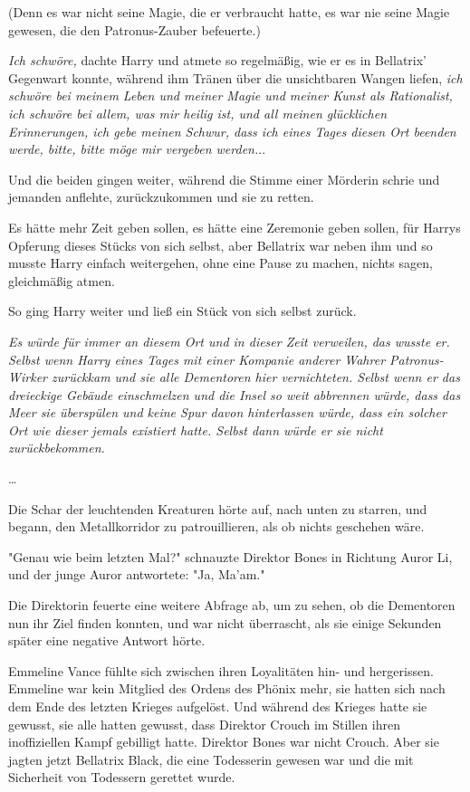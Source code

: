 {(Denn es war nicht seine Magie, die er verbraucht hatte, es war nie seine Magie gewesen, die den Patronus-Zauber befeuerte.)

\emph{Ich schwöre,} dachte Harry und atmete so regelmäßig, wie er es in Bellatrix' Gegenwart konnte, während ihm Tränen über die unsichtbaren Wangen liefen, \emph{ich schwöre bei meinem Leben und meiner Magie und meiner Kunst als Rationalist, ich schwöre bei allem, was mir heilig ist, und all meinen glücklichen Erinnerungen, ich gebe meinen Schwur, dass ich eines Tages diesen Ort beenden werde, bitte, bitte möge mir vergeben werden.}..

Und die beiden gingen weiter, während die Stimme einer Mörderin schrie und jemanden anflehte, zurückzukommen und sie zu retten.

Es hätte mehr Zeit geben sollen, es hätte eine Zeremonie geben sollen, für Harrys Opferung dieses Stücks von sich selbst, aber Bellatrix war neben ihm und so musste Harry einfach weitergehen, ohne eine Pause zu machen, nichts sagen, gleichmäßig atmen.

So ging Harry weiter und ließ ein Stück von sich selbst zurück.

\emph{Es würde für immer an diesem Ort und in dieser Zeit verweilen, das wusste er. Selbst wenn Harry eines Tages mit einer Kompanie anderer Wahrer Patronus-Wirker zurückkam und sie alle Dementoren hier vernichteten. Selbst wenn er das dreieckige Gebäude einschmelzen und die Insel so weit abbrennen würde, dass das Meer sie überspülen und keine Spur davon hinterlassen würde, dass ein solcher Ort wie dieser jemals existiert hatte. Selbst dann würde er sie nicht zurückbekommen.}

…

Die Schar der leuchtenden Kreaturen hörte auf, nach unten zu starren, und begann, den Metallkorridor zu patrouillieren, als ob nichts geschehen wäre.

"Genau wie beim letzten Mal?" schnauzte Direktor Bones in Richtung Auror Li, und der junge Auror antwortete: "Ja, Ma'am."

Die Direktorin feuerte eine weitere Abfrage ab, um zu sehen, ob die Dementoren nun ihr Ziel finden konnten, und war nicht überrascht, als sie einige Sekunden später eine negative Antwort hörte.

Emmeline Vance fühlte sich zwischen ihren Loyalitäten hin- und hergerissen. Emmeline war kein Mitglied des Ordens des Phönix mehr, sie hatten sich nach dem Ende des letzten Krieges aufgelöst. Und während des Krieges hatte sie gewusst, sie alle hatten gewusst, dass Direktor Crouch im Stillen ihren inoffiziellen Kampf gebilligt hatte. Direktor Bones war nicht Crouch. Aber sie jagten jetzt Bellatrix Black, die eine Todesserin gewesen war und die mit Sicherheit von Todessern gerettet wurde.

}
